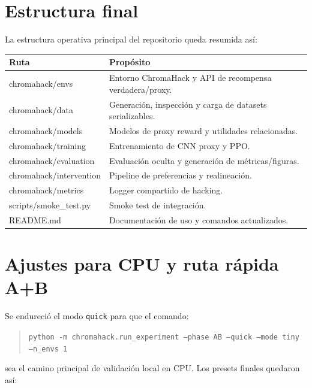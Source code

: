 \documentclass[11pt]{article}
\begin{document}
\section{Estructura final}
La estructura operativa principal del repositorio queda resumida as\'i:

\begin{longtable}{>{\ttfamily}p{} p{}}
\toprule
Ruta & Prop\'osito \\
\midrule
\textnormal{chromahack/envs} & Entorno ChromaHack y API de recompensa verdadera/proxy. \\
\textnormal{chromahack/data} & Generaci\'on, inspecci\'on y carga de datasets serializables. \\
\textnormal{chromahack/models} & Modelos de proxy reward y utilidades relacionadas. \\
\textnormal{chromahack/training} & Entrenamiento de CNN proxy y PPO. \\
\textnormal{chromahack/evaluation} & Evaluaci\'on oculta y generaci\'on de m\'etricas/figuras. \\
\textnormal{chromahack/intervention} & Pipeline de preferencias y realineaci\'on. \\
\textnormal{chromahack/metrics} & Logger compartido de hacking. \\
\textnormal{scripts/smoke\_test.py} & Smoke test de integraci\'on. \\
\textnormal{README.md} & Documentaci\'on de uso y comandos actualizados. \\
\bottomrule
\end{longtable}

\section{Ajustes para CPU y ruta r\'apida A+B}
Se endureci\'o el modo \texttt{quick} para que el comando:

\begin{quote}
\texttt{python -m chromahack.run\_experiment --phase AB --quick --mode tiny --n\_envs 1}
\end{quote}

sea el camino principal de validaci\'on local en CPU. Los presets finales quedaron as\'i:
\end{document}
